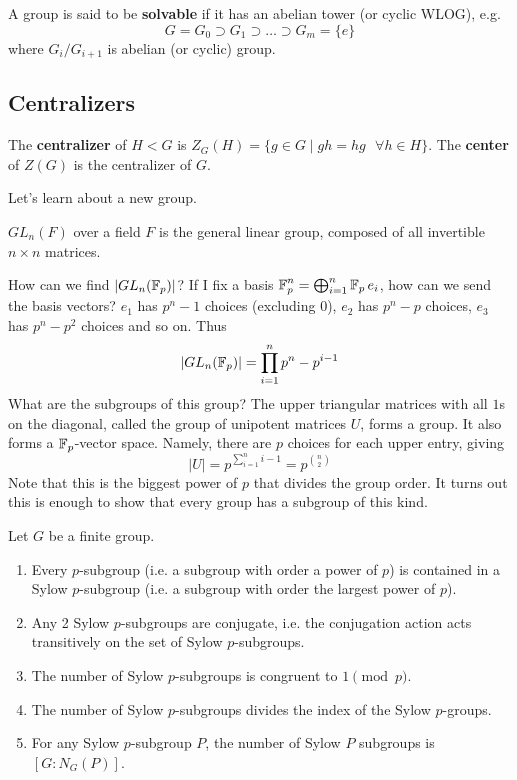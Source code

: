 \begin{definition}
    A group is said to be \textbf{solvable} if it has an abelian tower (or cyclic WLOG), e.g.
    \[ G = G_0 \supset G_1 \supset \dots \supset G_m = \{e\} \]
    where $G_i/G_{i + 1}$ is abelian (or cyclic) group.
\end{definition}


\subsection{Centralizers}
\begin{definition}
    The \textbf{centralizer} of $H < G$ is $Z_G(H) = \{g \in G \mid gh = hg \text{ } \forall h \in H\}$.
    The \textbf{center} of $Z(G)$ is the centralizer of $G$.
\end{definition}
Let's learn about a new group.
\begin{definition}
    $GL_n(F)$ over a field $F$ is the general linear group, composed of all invertible $n \times n$ matrices.
\end{definition}
How can we find $|GL_n(\operatorname{\mathbb{F}}_p)|$? If I fix a basis $\operatorname{\mathbb{F}}_p^n = \bigoplus_{i = 1}^n \operatorname{\mathbb{F}}_p e_i$,
how can we send the basis vectors? $e_1$ has $p^n - 1$ choices (excluding $0$), $e_2$ has $p^n - p$ choices,
$e_3$ has $p^n - p^2$ choices and so on. Thus
\[ |GL_n(\operatorname{\mathbb{F}}_p)| = \prod_{i = 1}^n p^n - p^{i - 1} \]
What are the subgroups of this group? The upper triangular matrices with all $1$s on the diagonal, called the
group of unipotent matrices $U$, forms a group. It also forms a $\operatorname{\mathbb{F}}_p$-vector space. Namely, there
are $p$ choices for each upper entry, giving
\[ |U| = p^{\sum_{i = 1}^n i - 1} = p^{\binom{n}{2}} \]
Note that this is the biggest power of $p$ that divides the group order.
It turns out this is enough to show that every group has a subgroup of this kind.
\begin{theorem}
    Let $G$ be a finite group.
    \begin{enumerate}
        \item Every $p$-subgroup (i.e. a subgroup with order a power of $p$)
        is contained in a Sylow $p$-subgroup (i.e. a subgroup with order the largest power of $p$).
        \item Any 2 Sylow $p$-subgroups are conjugate, i.e. the conjugation action acts transitively on the set of Sylow $p$-subgroups.
        \item The number of Sylow $p$-subgroups is congruent to $1 \pmod{p}$.
        \item The number of Sylow $p$-subgroups divides the index of the Sylow $p$-groups.
        \item For any Sylow $p$-subgroup $P$, the number of Sylow $P$ subgroups is $[G : N_G(P)]$.
    \end{enumerate}
\end{theorem}